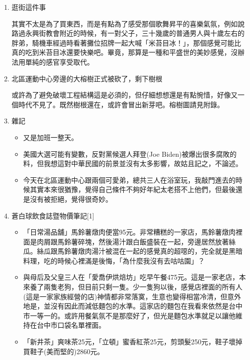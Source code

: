 \documentclass[
]{article}
\providecommand{\tightlist}{%
  \setlength{\itemsep}{0pt}\setlength{\parskip}{0pt}}
\begin{document}
\begin{enumerate}
\def\labelenumi{\arabic{enumi}.}
\item
  逛街這件事

  其實不太是為了買東西，而是有點為了感受那個歌舞昇平的喜樂氣氛，例如說路過永興街教會附近的時候，有一對父子，三十幾歲的普通男人與十歲左右的胖弟，騎機車經過時看著攤位招牌一起大喊「米苔目冰！」，那個感覺可能比真的吃到米苔目冰還要快樂吧。畢竟，那算是一種和平盛世的美妙感覺，沒辦法用單純的感官享受取代。
\item
  北區運動中心旁邊的大榕樹正式被砍了，剩下樹根

  或許為了避免破壞工程結構這是必須的，但仔細想想還是有點惋惜，好像又一個時代不見了。既然樹根還在，或許會冒出新芽吧。榕樹圖請見附錄。
\item
  雜記

  \begin{itemize}
  \tightlist
  \item
    又是加班一整天。
  \item
    美國大選可能有變數，反對黨候選人拜登(Joe
    Biden)被爆出很多腐敗的料，但我想這對中華民國的前景並沒有太多影響，故姑且記之，不論述。
  \item
    今天在北區運動中心跟兩個可愛弟，總共三人在浴室玩，我敲門進去的時候其實本來很猶豫，覺得自己條件不夠好年紀太老搭不上他們，但最後還是沒有被拒絕，覺得很奇妙。
  \end{itemize}
\item
  蒼白球飲食誌暨物價筆記{[}1{]}

  \begin{itemize}
  \tightlist
  \item
    「日常湯品舖」馬鈴薯燉肉便當95元。非常糟糕的一家店，馬鈴薯燉肉裡面是肉屑跟馬鈴薯碎塊，然後湯汁跟白飯盛裝在一起，旁邊居然放著絲瓜。絲瓜跟馬鈴薯燉肉湯汁被混在一起的感覺真的超噁的，完全就是黑暗料理，吃的時候心裡滿是後悔，「為什麼我沒有去咕咕園」？
  \item
    與母后及父皇三人在「愛喬伊烘焙坊」吃早午餐475元。這是一家老店，本來養了兩隻老狗，但目前只剩一隻。少一隻狗以後，感覺店裡面的所有人(這是一家家族經營的店)神情都非常落寞，生意也變得相當冷清，但意外地是，並沒有因此而減低麵包的水準。這家店的麵包在我看來依然是台中市一等一的。或許用餐氣氛不是那麼好了，但光是麵包水準就足以讓他維持在台中市口袋名單裡面。
  \item
    「新井茶」爽味茶25元，「立頓」蜜香紅茶25元，剪頭髮250元，鞋子壞掉買鞋子(美而堅的)2860元。
  \end{itemize}
\end{enumerate}
\end{document}
